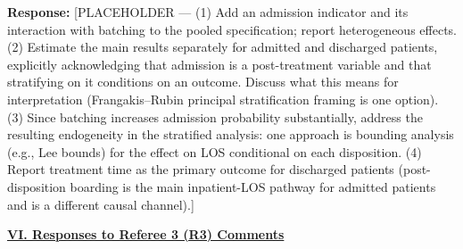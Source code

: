 \documentclass[11pt]{article}
\newcommand{\1}{\hbox{\rm 1\kern-.35em 1}}
\begin{document}
\noindent\textbf{Response:} \color{blue}[PLACEHOLDER --- (1) Add an admission indicator and its interaction with batching to the pooled specification; report heterogeneous effects. (2) Estimate the main results separately for admitted and discharged patients, explicitly acknowledging that admission is a post-treatment variable and that stratifying on it conditions on an outcome. Discuss what this means for interpretation (Frangakis--Rubin principal stratification framing is one option). (3) Since batching increases admission probability substantially, address the resulting endogeneity in the stratified analysis: one approach is bounding analysis (e.g., Lee bounds) for the effect on LOS conditional on each disposition. (4) Report treatment time as the primary outcome for discharged patients (post-disposition boarding is the main inpatient-LOS pathway for admitted patients and is a different causal channel).]
\color{black}

\clearpage


\pagestyle{fancy}
\fancyhead{}
\renewcommand{\headrulewidth}{0pt}

\noindent\underline{\textbf{VI. Responses to Referee 3 (R3) Comments}}
\end{document}
